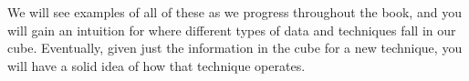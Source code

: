 We will see examples of all of these as we progress throughout the book, and you will gain an intuition for where different types of data and techniques fall in our cube. Eventually, given just the information in the cube for a new technique, you will have a solid idea of how that technique operates.
